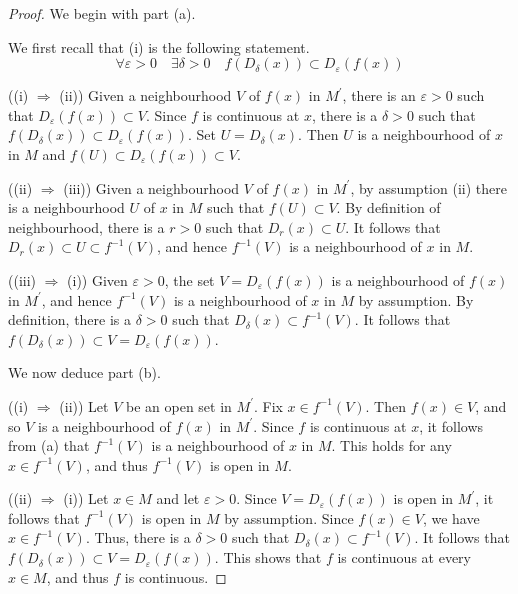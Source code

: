 \documentclass[a4paper]{article}
\begin{document}
\begin{proof}
    We begin with part (a). 
    
    We first recall that (i) is the following statement.
    \[
        \forall \varepsilon>0 \quad \exists \delta>0 \quad f\left(D_\delta(x)\right) \subset D_{\varepsilon}(f(x))
    \]

    ((i) $\Rightarrow$ (ii)) Given a neighbourhood $V$ of $f(x)$ in $M^{\prime}$, there is an $\varepsilon>0$ such that $D_{\varepsilon}(f(x)) \subset V$. Since $f$ is continuous at $x$, there is a $\delta>0$ such that $f\left(D_\delta(x)\right) \subset D_{\varepsilon}(f(x))$. Set $U=D_\delta(x)$. Then $U$ is a neighbourhood of $x$ in $M$ and $f(U) \subset D_{\varepsilon}(f(x)) \subset V$.

    ((ii) $\Rightarrow$ (iii)) Given a neighbourhood $V$ of $f(x)$ in $M^{\prime}$, by assumption (ii) there is a neighbourhood $U$ of $x$ in $M$ such that $f(U) \subset V$. By definition of neighbourhood, there is a $r>0$ such that $D_r(x) \subset U$. It follows that $D_r(x) \subset U \subset f^{-1}(V)$, and hence $f^{-1}(V)$ is a neighbourhood of $x$ in $M$.

    ((iii) $\Rightarrow$ (i)) Given $\varepsilon>0$, the set $V=D_{\varepsilon}(f(x))$ is a neighbourhood of $f(x)$ in $M^{\prime}$, and hence $f^{-1}(V)$ is a neighbourhood of $x$ in $M$ by assumption. By definition, there is a $\delta>0$ such that $D_\delta(x) \subset f^{-1}(V)$. It follows that $f\left(D_\delta(x)\right) \subset V=D_{\varepsilon}(f(x))$. 

    We now deduce part (b).

    ((i) $\Rightarrow$ (ii)) Let $V$ be an open set in $M^{\prime}$. Fix $x \in f^{-1}(V)$. Then $f(x) \in V$, and so $V$ is a neighbourhood of $f(x)$ in $M^{\prime}$. Since $f$ is continuous at $x$, it follows from (a) that $f^{-1}(V)$ is a neighbourhood of $x$ in $M$. This holds for any $x \in f^{-1}(V)$, and thus $f^{-1}(V)$ is open in $M$.

    ((ii) $\Rightarrow$ (i)) Let $x \in M$ and let $\varepsilon>0$. Since $V=D_{\varepsilon}(f(x))$ is open in $M^{\prime}$, it follows that $f^{-1}(V)$ is open in $M$ by assumption. Since $f(x) \in V$, we have $x \in f^{-1}(V)$. Thus, there is a $\delta>0$ such that $D_\delta(x) \subset f^{-1}(V)$. It follows that $f\left(D_\delta(x)\right) \subset V=D_{\varepsilon}(f(x))$. This shows that $f$ is continuous at every $x \in M$, and thus $f$ is continuous.
\end{proof}
\end{document}
